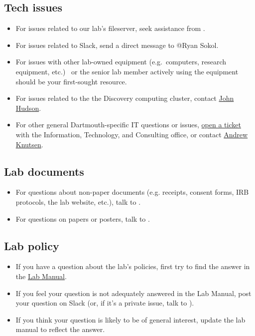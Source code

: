 \documentclass{tufte-book} %
\begin{document}
\subsection{Tech issues}
\begin{itemize}
\item For issues related to our lab's fileserver, seek assistance from
  \director.

\item For issues related to Slack, send a direct message to @Ryan Sokol.

\item For issues with other lab-owned equipment (e.g.~computers,
  research equipment, etc.) \coordinator~or the senior lab member
  actively using the equipment should be your first-sought resource.

\item For issues related to the the Discovery computing cluster,
  contact \href{mailto:John.P.Hudson@Dartmouth.edu}{John Hudson}.

\item For other general Dartmouth-specific IT questions or issues,
  \href{help@dartmouth.edu}{open a ticket} with the Information,
  Technology, and Consulting office, or contact
  \href{mailto:Andrew.C.Knutsen@Dartmouth.edu}{Andrew Knutsen}.
\end{itemize}

\subsection{Lab documents}
\begin{itemize}
\item For questions about non-paper documents (e.g. receipts, consent
  forms, IRB protocols, the lab website, etc.), talk to \coordinator.

\item For questions on papers or posters, talk to \director.
\end{itemize}

\subsection{Lab policy}
\begin{itemize}
\item If you have a question about the lab's policies, first try to
  find the answer in the
  \href{https://github.com/ContextLab/lab-manual/tree/master/lab_manual.pdf}{Lab
    Manual}.

\item If you feel your question is not adequately answered in the Lab
  Manual, post your question on Slack (or, if it's a private issue,
  talk to \director).

\item If you think your question is likely to be of general interest,
  update the lab manual to reflect the answer.
\end{itemize}
\end{document}

